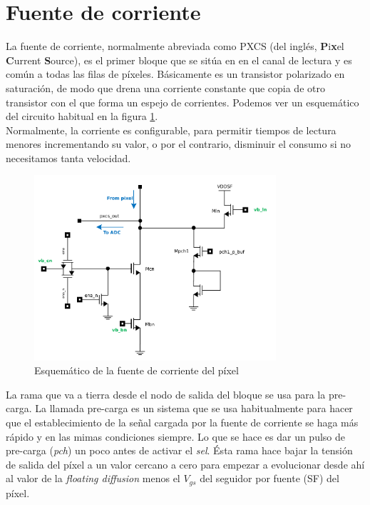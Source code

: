 \section{Fuente de corriente}\label{cap:ro_sch_pxcs}

La fuente de corriente, normalmente abreviada como PXCS (del inglés,
\textbf{P}i\textbf{x}el \textbf{C}urrent \textbf{S}ource),
es el primer bloque que se sitúa en
en el canal de lectura y es común a todas las filas de píxeles. Básicamente
es un transistor polarizado en saturación, de modo que drena una corriente
constante que copia de otro transistor con el que forma un espejo de corrientes.
Podemos ver un esquemático del circuito habitual en la figura \ref{fig:pxcs_sch}.\\

Normalmente, la corriente es configurable, para permitir tiempos de lectura menores
incrementando su  valor, o por el contrario, disminuir el consumo si no necesitamos tanta
velocidad.

\begin{figure}[h]
	\centering
	\includegraphics[width=0.8\textwidth]{svg/pxcs_sch.pdf}
	\caption{Esquemático de la fuente de corriente del píxel}
	\label{fig:pxcs_sch}
\end{figure}

La rama que va a tierra desde el nodo de salida del bloque se usa para la pre-carga.
La llamada pre-carga es un sistema que se usa habitualmente para hacer que el
establecimiento de la señal cargada por la fuente de corriente se haga más rápido
y en las mimas condiciones siempre. Lo que se hace es dar un pulso de pre-carga
(\textit{pch}) un poco antes de activar el \textit{sel}. Ésta rama hace bajar la
tensión de salida del píxel a un valor cercano a cero para empezar a evolucionar
desde ahí al valor de la \textit{floating diffusion} menos el $V_{gs}$ del seguidor
por fuente (SF) del píxel.\\

